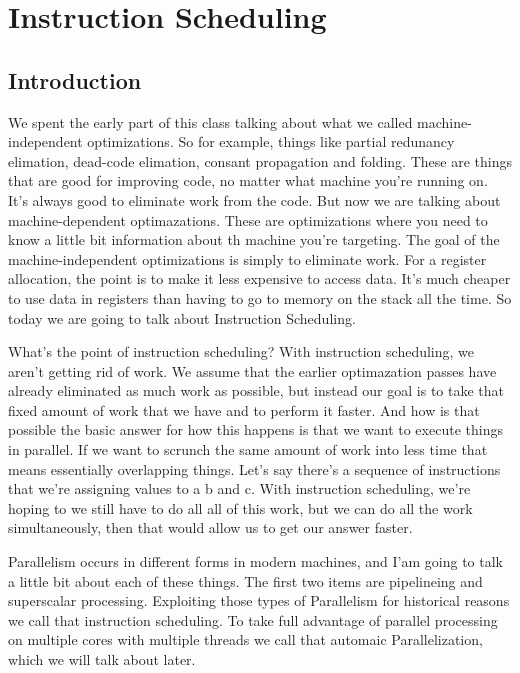\section{Instruction Scheduling}
\subsection{Introduction}
We spent the early part of this class talking about what we called
machine-independent optimizations. So for example, things like
partial redunancy elimation, dead-code elimation, consant propagation and 
folding. These are things that are good for improving code, no matter
what machine you're running on. It's always good to eliminate work
from the code. But now we are talking about machine-dependent optimazations.
These are optimizations where you need to know a little bit information
about th machine you're targeting. The goal of the machine-independent
optimizations is simply to eliminate work. For a register allocation, the point
is to make it less expensive to access data. It's much cheaper to use data in 
registers than having to go to memory on the stack all the time. So today we are going to 
talk about Instruction Scheduling. 

What's the point of instruction scheduling? With instruction scheduling, 
we aren't getting rid of work. We assume that the earlier optimazation passes have 
already eliminated as much work as possible, but instead our goal is to take that 
fixed amount of work that we have and to perform it faster. And how is that possible
the basic answer for how this happens is that we want to execute things in parallel.
If we want to scrunch the same amount of work into less time that means essentially
overlapping things. Let's say there's a sequence of instructions that we're assigning 
values to a b and c. With instruction scheduling, we're hoping to we still have to do all
all of this work, but we can do all the work simultaneously, then that would allow 
us to get our answer faster. 

Parallelism occurs in different forms in modern machines, and I'am going to talk a little
bit about each of these things. The first two items are pipelineing and superscalar 
processing. Exploiting those types of Parallelism for historical reasons we call that 
instruction scheduling. To take full advantage of parallel processing on multiple cores
with multiple threads we call that automaic Parallelization, which we will talk about
later. 

